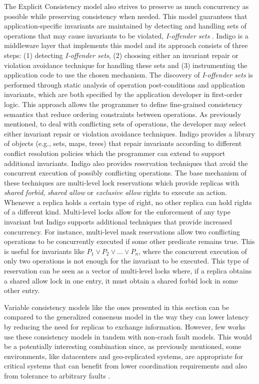 The Explicit Consistency model also strives to preserve as much concurrency as possible while preserving consistency when needed. This model guarantees that application-specific invariants are maintained by detecting and handling sets of operations that may cause invariants to be violated, \textit{I-offender sets} \cite{Balegas2015}. Indigo is a middleware layer that implements this model and its approach consists of three steps: (1) detecting \textit{I-offender sets}, (2) choosing either an invariant repair or violation avoidance technique for handling these sets and (3) instrumenting the application code to use the chosen mechanism. The discovery of \textit{I-offender sets} is performed through static analysis of operation post-conditions and application invariants, which are both specified by the application developer in first-order logic. This approach allows the programmer to define fine-grained consistency semantics that reduce ordering constraints between operations. As previously mentioned, to deal with conflicting sets of operations, the developer may select either invariant repair or violation avoidance techniques. Indigo provides a library of objects (e.g., sets, maps, trees) that repair invariants according to different conflict resolution policies which the programmer can extend to support additional invariants. Indigo also provides reservation techniques that avoid the concurrent execution of possibly conflicting operations. The base mechanism of these techniques are multi-level lock reservations which provide replicas with \textit{shared forbid}, \textit{shared allow} or \textit{exclusive allow} rights to execute an action. Whenever a replica holds a certain type of right, no other replica can hold rights of a different kind. Multi-level locks allow for the enforcement of any type invariant but Indigo supports additional techniques that provide increased concurrency. For instance, multi-level mask reservations allow two conflicting operations to be concurrently executed if some other predicate remains true. This is useful for invariants like $P_1 \vee P_2 \vee ... \vee P_n$, where the concurrent execution of only two operations is not enough for the invariant to be executed. This type of reservation can be seen as a vector of multi-level locks where, if a replica obtains a shared allow lock in one entry, it must obtain a shared forbid lock in some other entry. \par
Variable consistency models like the ones presented in this section can be compared to the generalized consensus model in the way they can lower latency by reducing the need for replicas to exchange information. However, few works use these consistency models in tandem with non-crash fault models. This would be a potentially interesting combination since, as previously mentioned, some environments, like datacenters and geo-replicated systems, are appropriate for critical systems that can benefit from lower coordination requirements and also from tolerance to arbitrary faults .

